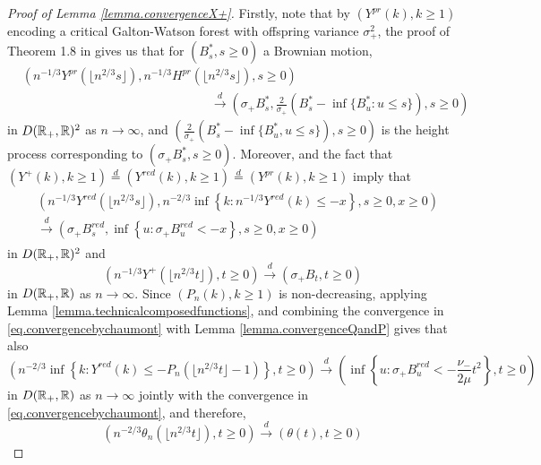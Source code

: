 \begin{proof}[Proof of Lemma \ref{lemma.convergenceX+}]
Firstly, note that by $(Y^{pr}(k),k\geq 1)$ encoding a critical Galton-Watson forest with offspring variance $\sigma_+^2$, the proof of Theorem 1.8 in \citet{legallRandomTreesApplications2005} gives us that for $(B^*_s,s\geq 0)$ a Brownian motion,
\begin{align}\label{eq.convergenceX}
&\left(n^{-1/3}Y^{pr}\left(\lfloor n^{2/3}s\rfloor \right), n^{-1/3}H^{pr}\left(\lfloor n^{2/3}s\rfloor \right), s\geq 0 \right) \nonumber \\
& \hspace{15em} \overset{d}{\to} \left(\sigma_+ B^*_s,\frac{2}{\sigma_+} \left(B^*_s-\inf\{B^*_u:u\leq s\}\right),  s\geq 0\right)
\end{align} 
 in $D({\mathbb R}_+,{\mathbb R})^2$ as $n\to \infty$, and $\left(\frac{2}{\sigma_+}(B^*_s-\inf\{B^*_u,u\leq s\}),s\geq 0\right)$ is the height process corresponding to $\left(\sigma_+ B^*_s,s \geq 0\right)$. Moreover, \cite{chaumontInvariancePrinciplesLocal2010} and the fact that $(Y^+(k),k\geq 1)\overset{d}{=}(Y^{red}(k),k\geq 1)\overset{d}{=}(Y^{pr}(k),k\geq 1)$ imply that
\begin{align}\begin{split}\label{eq.convergencebychaumont}&\left(n^{-1/3}Y^{red}\left(\lfloor n^{2/3} s \rfloor \right), n^{-2/3}\inf\left\{k:n^{-1/3}Y^{red}(k) \leq -x\right\}, s \geq 0, x\geq 0 \right)\\
&\overset{d}{\to}\left( \sigma_+ B^{red}_s, \inf\left\{u:\sigma_+ B^{red}_u < -x\right\}, s\geq 0, x \geq 0\right)\end{split}\end{align}
in $D({\mathbb R}_+,{\mathbb R})^2$ and 
$$\left(n^{-1/3}Y^+\left(\lfloor n^{2/3} t\rfloor \right),t\geq 0\right)\overset{d}{\to}\left(\sigma_+ B_t, t\geq 0\right)$$
in $D({\mathbb R}_+,{\mathbb R})$ as $n\to \infty$. 
Since $(P_n(k),k\geq 1)$ is non-decreasing, applying Lemma \ref{lemma.technicalcomposedfunctions}, and combining the convergence in \eqref{eq.convergencebychaumont} with Lemma \ref{lemma.convergenceQandP} gives that also
$$\left(n^{-2/3}\inf\left\{k:Y^{red}(k) \leq - P_n\left(\lfloor n^{2/3} t \rfloor -1\right)\right\},t\geq 0\right)\overset{d}{\to}\left(\inf\left\{u:\sigma_+ B^{red}_u< -\frac{\nu_-}{2\mu} t^2\right\},t\geq 0\right)$$
  in $D({\mathbb R}_+,{\mathbb R})$ as $n\to \infty$ jointly with the convergence in \eqref{eq.convergencebychaumont},
  and therefore, 
 \begin{equation}\label{eq.convergencetheta}\left(n^{-2/3}\theta_n\left(\lfloor n^{2/3}t\rfloor \right),t\geq 0 \right) \overset{d}{\to} \left(\theta(t),t\geq 0\right)\end{equation}

\end{proof}
